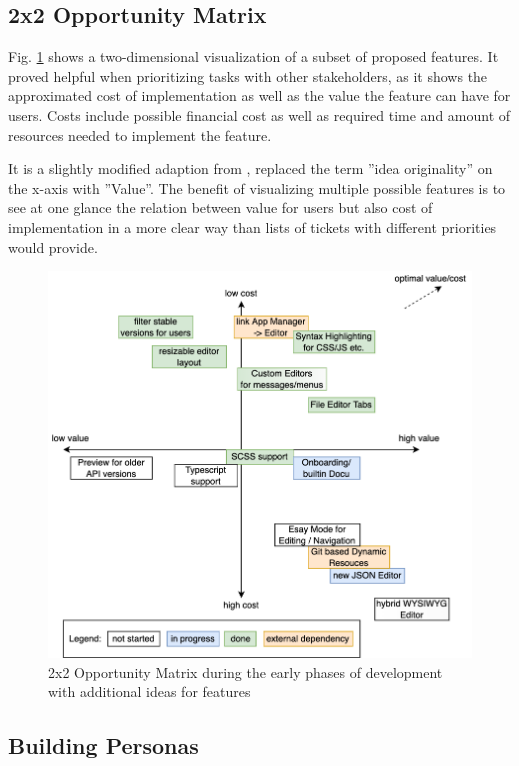 \subsection{2x2 Opportunity Matrix}

Fig. \ref{fig:opportunitymatrix} shows a two-dimensional visualization of a subset of proposed features.
It proved helpful when prioritizing tasks with other stakeholders,
as it shows the approximated cost of implementation as well as the value the feature can have for users.
Costs include possible financial cost as well as required time and amount of resources needed to implement the feature.

It is a slightly modified adaption from \cite[p. 181]{LearnHCI:2020ys}, replaced the term ''idea originality'' on the x-axis with ''Value''.
The benefit of visualizing multiple possible features is to see at one glance the relation between value for users but also cost of implementation in a more clear way than lists of tickets with different priorities would provide.

\begin{figure}[h!]
	\centering
  \includegraphics[width=\textwidth]{pics/feature_cost_matrix.drawio.png}
	\caption{2x2 Opportunity Matrix during the early phases of development with additional ideas for features}
	\label{fig:opportunitymatrix}
\end{figure}


\subsection{Building Personas}
\label{subsec:personas}

